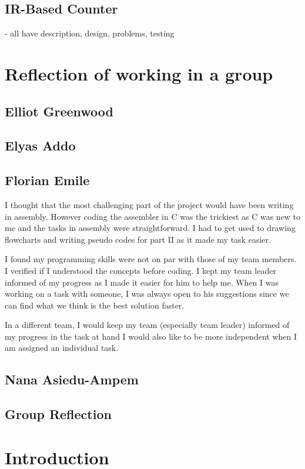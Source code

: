 \documentclass[11pt]{article}
\begin{document}
\subsection{IR-Based Counter}

  - all have description, design, problems, testing

\section{Reflection of working in a group}
\subsection{Elliot Greenwood}
\subsection{Elyas Addo}
\subsection{Florian Emile}

I thought that the most challenging part of the project would have been writing
in assembly. However coding the assembler in C was the trickiest as C was new to
me and the tasks in assembly were straightforward. I had to get used to drawing
flowcharts and writing pseudo codes for part II as it made my task easier.

I found my programming skills were not on par with those of my team members. I
verified if I understood the concepts before coding. I kept my team leader
informed of my progress as I made it easier for him to help me. When I was
working on a task with someone, I was always open to his suggestions since we
can find what we think is the best solution faster.

In a different team, I would keep my team (especially team leader) informed of
my progress in the task at hand I would also like to be more independent when I
am assigned an individual task.

\subsection{Nana Asiedu-Ampem}
\subsection{Group Reflection}

\section{Introduction}
\end{document}
